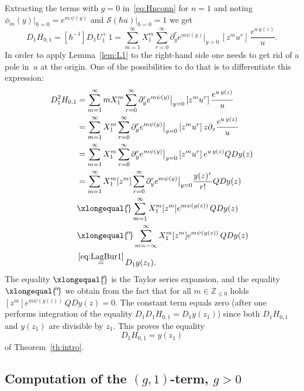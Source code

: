 \documentclass[JEP,XML,SOM,Unicode,NoEqCountersInSection,NoFloatCountersInSection]{cedram}
\let\mathcal\mathscr
\theoremstyle{plain}
\theoremstyle{definition}
\theoremstyle{remark}
\newcommand{\cS}{\mathcal{S}}
\begin{document}
Extracting the terms with $g=0$ in~\eqref{eq:Hnconn} for $n=1$ and noting $\phi_m(y)\big|_{\hbar=0}=e^{m\,\psi(y)}$ and $\cS(\hbar u)\big|_{\hbar=0}=1$ we get
\begin{equation*}
D_1H_{0,1}=[\hbar^{-1}]D_1U_1^+\,1=\sum_{m=1}^\infty X_1^m\sum_{r=0}^\infty\partial_y^r e^{m\psi(y)}\big|_{y=0}\,[z^mu^r]\,
\frac{e^{u\,y(z)}}{u}.
\end{equation*}
In order to apply Lemma~\ref{lem:L1} to the right-hand side one needs to get rid of a pole in~$u$ at the origin. One of the possibilities to do that is to differentiate this expression:
\begin{align*}
D_1^2H_{0,1}&=\sum_{m=1}^\infty m X_1^m\sum_{r=0}^\infty\partial_y^r e^{m\psi(y)}\big|_{y=0}\,[z^mu^r]\,
\frac{e^{u\,y(z)}}{u}
\\ &=
\sum_{m=1}^\infty X_1^m\sum_{r=0}^\infty\partial_y^r e^{m\psi(y)}\big|_{y=0}\,[z^mu^r]\,
z\partial_z\frac{e^{u\,y(z)}}{u}
\\ &=
\sum_{m=1}^\infty X_1^m\sum_{r=0}^\infty\partial_y^r e^{m\psi(y)}\big|_{y=0}\,[z^mu^r]\,e^{u\,y(z)}QDy(z)
\\ &=
\sum_{m=1}^\infty X_1^m[z^{m}]\sum_{r=0}^\infty
\partial_y^r e^{m\psi(y)}\big|_{y=0}\frac{y(z)^r}{r!}QDy(z)
\\ &\xlongequal{\!'\!}
\sum_{m=1}^\infty X_1^m[z^{m}] e^{m\psi(y(z))}\,QDy(z)
\\ &\xlongequal{\!''\!}
\sum_{m=-\infty}^\infty X_1^m[z^{m}] e^{m\psi(y(z))}\,QDy(z)
\\ &\mathop{=}^{\eqref{eq:LagBur1}}
D_1y(z_1).
\end{align*}
The equality $\xlongequal{\!'\!}$ is the Taylor series expansion, and the equality $\xlongequal{\!''\!}$ we obtain from the fact that for all $m\in \mathbb{Z}_{\leq 0}$ holds $[z^{m}] e^{m\psi(y(z))}\,QDy(z) =0$.
The constant term equals zero (after one performs integration of the equality $D_1D_1H_{0,1}=D_1 y(z_1)$) since both $D_1H_{0,1}$ and $y(z_1)$ are divisible by $z_1$. This proves the equality
\begin{equation*}
D_1H_{0,1}=y(z_1)
\end{equation*}
of Theorem~\ref{th:intro}.

\subsection{Computation of the \texorpdfstring{$(g,1)$}{(g,1)}-term, \texorpdfstring{$g>0$}{g>0}}
\end{document}
